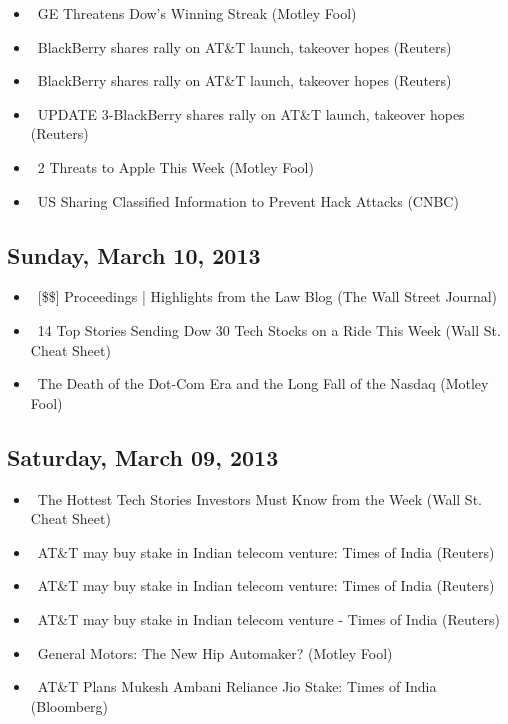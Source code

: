 \documentclass[11pt,asymmetric]{article}
\begin{document}
\begin{itemize}
\item\ GE Threatens Dow's Winning Streak (Motley Fool)
\item\ BlackBerry shares rally on AT\&T launch, takeover hopes (Reuters)
\item\ BlackBerry shares rally on AT\&T launch, takeover hopes (Reuters)
\item\ UPDATE 3-BlackBerry shares rally on AT\&T launch, takeover hopes (Reuters)
\item\ 2 Threats to Apple This Week (Motley Fool)
\item\ US Sharing Classified Information to Prevent Hack Attacks (CNBC)
\end{itemize}
\subsection*{Sunday, March 10, 2013}
\begin{itemize}
\item\ [\$\$] Proceedings | Highlights from the Law Blog (The Wall Street Journal)
\item\ 14 Top Stories Sending Dow 30 Tech Stocks on a Ride This Week (Wall St. Cheat Sheet)
\item\ The Death of the Dot-Com Era and the Long Fall of the Nasdaq (Motley Fool)
\end{itemize}
\subsection*{Saturday, March 09, 2013}
\begin{itemize}
\item\ The Hottest Tech Stories Investors Must Know from the Week (Wall St. Cheat Sheet)
\item\ AT\&T may buy stake in Indian telecom venture: Times of India (Reuters)
\item\ AT\&T may buy stake in Indian telecom venture: Times of India (Reuters)
\item\ AT\&T may buy stake in Indian telecom venture - Times of India (Reuters)
\item\ General Motors: The New Hip Automaker? (Motley Fool)
\item\ AT\&T Plans Mukesh Ambani Reliance Jio Stake: Times of India (Bloomberg)
\end{itemize}
\end{document}

